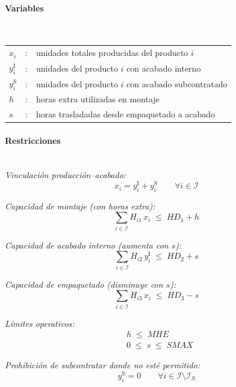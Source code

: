 \paragraph{Variables}\mbox{}\\
\begin{tabular}{lcl}
$x_i$               & : & unidades totales producidas del producto $i$ \\
$y_i^{\mathrm{I}}$  & : & unidades del producto $i$ con acabado interno \\
$y_i^{\mathrm{S}}$  & : & unidades del producto $i$ con acabado subcontratado \\
$h$                 & : & horas extra utilizadas en montaje \\
$s$                 & : & horas trasladadas desde empaquetado a acabado \\
\end{tabular}

\paragraph{Restricciones}\mbox{}\\
\textit{Vinculación producción–acabado:}
\begin{equation}
x_i = y_i^{\mathrm{I}} + y_i^{\mathrm{S}} \qquad \forall i \in \mathcal{I}
\end{equation}

\textit{Capacidad de montaje (con horas extra):}
\begin{equation}
\sum_{i\in\mathcal{I}} H_{i1}\, x_i \;\leq\; HD_1 + h
\end{equation}

\textit{Capacidad de acabado interno (aumenta con $s$):}
\begin{equation}
\sum_{i\in\mathcal{I}} H_{i2}\, y_i^{\mathrm{I}} \;\leq\; HD_2 + s
\end{equation}

\textit{Capacidad de empaquetado (disminuye con $s$):}
\begin{equation}
\sum_{i\in\mathcal{I}} H_{i3}\, x_i \;\leq\; HD_3 - s
\end{equation}

\textit{Límites operativos:}
\begin{align}
& h \;\leq\; MHE \\
& 0 \;\leq\; s \;\leq\; SMAX
\end{align}

\textit{Prohibición de subcontratar donde no esté permitido:}
\begin{equation}
y_i^{\mathrm{S}} = 0 \qquad \forall i \in \mathcal{I}\setminus\mathcal{I}_S
\end{equation}

